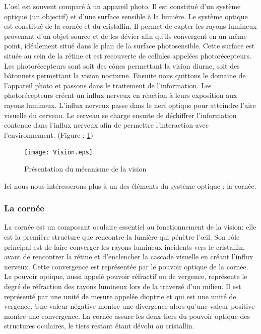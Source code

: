\documentclass[a4paper,12pt]{article}
\begin{document}
L’œil est souvent comparé à un appareil photo. Il est constitué d'un système optique (un objectif) et d'une surface sensible à la lumière. Le système optique est constitué de la cornée et du cristallin. Il permet de capter les rayons lumineux provenant d'un objet source et de les dévier afin qu'ils convergent en un même point, idéalement situé dans le plan de la surface photosensible. Cette surface est située au sein de la rétine et est recouverte de cellules appelées photorécepteurs. Les photorécepteurs sont soit des cônes permettant la vision diurne, soit des bâtonnets permettant la vision nocturne. Ensuite nous quittons le domaine de l'appareil photo et passons dans le traitement de l'information. Les photorécepteurs créent un influx nerveux en réaction à leurs exposition aux rayons lumineux. L'influx nerveux passe dans le nerf optique pour atteindre l'aire visuelle du cerveau. Le cerveau se charge ensuite de déchiffrer l'information contenue dans l'influx nerveux afin de permettre l'interaction avec l'environnement. (Figure : \ref{fig:Vision})

\begin{figure}[h]
	\centering
	\texttt{[image: Vision.eps]} 
	\caption{Présentation du mécanisme de la vision}
	\label{fig:Vision}
\end{figure}


Ici nous nous intéresserons plus à un des éléments du système optique : la cornée.



		\subsubsection{La cornée}

La cornée est un composant oculaire essentiel au fonctionnement de la vision: elle est la première structure que rencontre la lumière qui pénètre l’œil. Son rôle principal est de faire converger les rayons lumineux incidents vers le cristallin, avant de rencontrer la rétine et d'enclencher la cascade visuelle en créant l'influx nerveux. Cette convergence est représentée par le pouvoir optique de la cornée. Le pouvoir optique, aussi appelé pouvoir réfractif ou de vergence, représente le degré de réfraction des rayons lumineux lors de la traversé d'un milieu. Il est représenté par une unité de mesure appelée dioptrie et qui est une unité de vergence.  Une valeur négative montre une divergence alors qu'une valeur positive montre une convergence. La cornée assure les deux tiers du pouvoir optique des structures oculaires, le tiers restant étant dévolu au cristallin. \cite{bookGatinel, gatinel}
\vspace{0.15cm}
\end{document}
